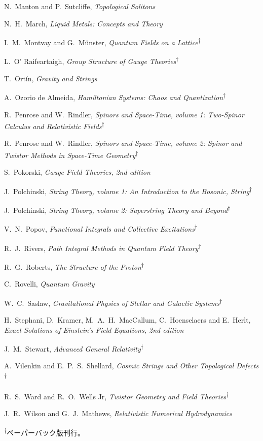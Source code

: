 \begin{list}{}{\setlength{\leftmargin}{0pt}\setlength{\rightmargin}{0pt}
\setlength{\itemsep}{2pt}\setlength{\parsep}{0pt}}
\item N.~Manton and P.~Sutcliffe, \emph{Topological Solitons}
\item N.~H.~March, \emph{Liquid Metals: Concepts and Theory}
\item I.~M.~Montvay and G.~Münster, \emph{Quantum Fields on a Lattice}\textsuperscript{\(\dagger\)}
\item L.~O' Raifeartaigh, \emph{Group Structure of Gauge Theories}\textsuperscript{\(\dagger\)}
\item T.~Ortín, \emph{Gravity and Strings}
\item A.~Ozorio de Almeida, \emph{Hamiltonian Systems: Chaos and Quantization}\textsuperscript{\(\dagger\)}
\item R.~Penrose and W.~Rindler, \emph{Spinors and Space-Time, volume 1: Two-Spinor Calculus and Relativistic Fields}\textsuperscript{\(\dagger\)}
\item R.~Penrose and W.~Rindler, \emph{Spinors and Space-Time, volume 2: Spinor and Twistor Methods in Space-Time Geometry}\textsuperscript{\(\dagger\)}
\item S.~Pokorski, \emph{Gauge Field Theories, 2nd edition}
\item J.~Polchinski, \emph{String Theory, volume 1: An Introduction to the Bosonic, String}\textsuperscript{\(\dagger\)}
\item J.~Polchinski, \emph{String Theory, volume 2: Superstring Theory and Beyond}\textsuperscript{\(\dagger\)}
\item V.~N.~Popov, \emph{Functional Integrals and Collective Excitations}\textsuperscript{\(\dagger\)}
\item R.~J.~Rivers, \emph{Path Integral Methods in Quantum Field Theory}\textsuperscript{\(\dagger\)}
\item R.~G.~Roberts, \emph{The Structure of the Proton}\textsuperscript{\(\dagger\)}
\item C.~Rovelli, \emph{Quantum Gravity}
\item W.~C.~Saslaw, \emph{Gravitational Physics of Stellar and Galactic Systems}\textsuperscript{\(\dagger\)}
\item H.~Stephani, D.~Kramer, M.~A.~H.~MacCallum, C.~Hoenselaers and E.~Herlt, \emph{Exact Solutions of Einstein's Field Equations, 2nd edition}
\item J.~M.~Stewart, \emph{Advanced General Relativity}\textsuperscript{\(\dagger\)}
\item A.~Vilenkin and E.~P.~S.~Shellard, \emph{Cosmic Strings and Other Topological Defects}\textsuperscript{\(\dagger\)}
\item R.~S.~Ward and R.~O.~Wells Jr, \emph{Twistor Geometry and Field Theories}\textsuperscript{\(\dagger\)}
\item J.~R.~Wilson and G.~J.~Mathews, \emph{Relativistic Numerical Hydrodynamics}
\end{list}
\noindent \textsuperscript{\(\dagger\)}ペーパーバック版刊行。
\endgroup

